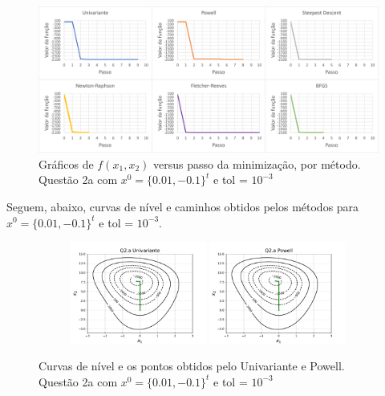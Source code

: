 \documentclass[10pt, a4paper]{article}
\begin{document}
\begin{figure}[H]
  \centering
  \includegraphics[scale=0.45]{figuras/q2a_fxpassos_P1.PNG}
  \caption{Gráficos de $f(x_1,x_2)$ versus passo da minimização, por método. Questão 2a com $x^0 = \{0.01,-0.1\}^t$ e tol = $10^{-3}$}
\end{figure}

Seguem, abaixo, curvas de nível e caminhos obtidos pelos métodos para $x^0 = \{0.01,-0.1\}^t$ e tol = $10^{-3}$. 

\begin{figure}[H]
  \centering
  \begin{subfigure}[b]{\textwidth}
    \includegraphics[width=0.49\textwidth]{figuras/Q2.a_Univariante_P0=[0.01e-0.1].pdf}
    \includegraphics[width=0.49\textwidth]{figuras/Q2.a_Powell_P0=[0.01e-0.1].pdf}
  \end{subfigure}
  \caption{Curvas de nível e os pontos obtidos pelo Univariante e Powell. Questão 2a com $x^0 = \{0.01,-0.1\}^t$ e tol = $10^{-3}$}
\end{figure}
\end{document}
